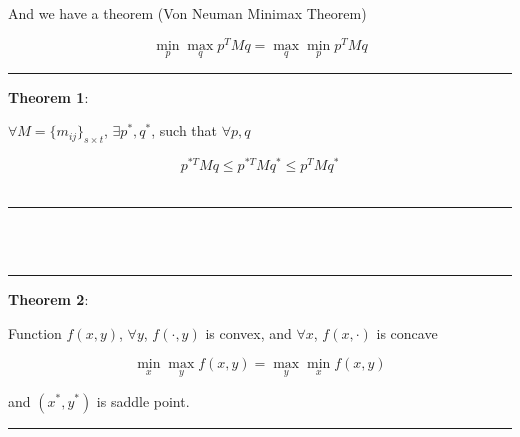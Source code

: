 \documentclass[UTF8]{article}
\begin{document}
And we have a theorem (Von Neuman Minimax Theorem)\par
\begin{equation*}
\min_{p}\max_{q}p^{T}Mq=\max_{q}\min_{p}p^{T}Mq
\end{equation*}
\rule{\textwidth}{0.5pt}\par
\textbf{Theorem 1}:\par
$\forall M=\{m_{ij}\}_{s\times t}$, $\exists p^{*},q^{*}$, such that $\forall p, q$\par
\begin{equation*}
p^{*T}Mq\leq p^{*T}Mq^{*}\leq p^{T}Mq^{*}
\end{equation*}\\
\rule{\textwidth}{0.5pt}\\
\vspace{9pt}
${}$\\
\rule{\textwidth}{0.5pt}\par
\textbf{Theorem 2}:\par
Function $f(x,y)$, $\forall y$, $f(\cdot,y)$ is convex, and $\forall x$, $f(x,\cdot)$ is concave\par
\begin{equation*}
\min_{x}\max_{y}f(x,y)=\max_{y}\min_{x}f(x,y)
\end{equation*}\par
and $(x^{*},y^{*})$ is saddle point.\\
\rule{\textwidth}{0.5pt}\par
\vspace{9pt}
\end{document}
